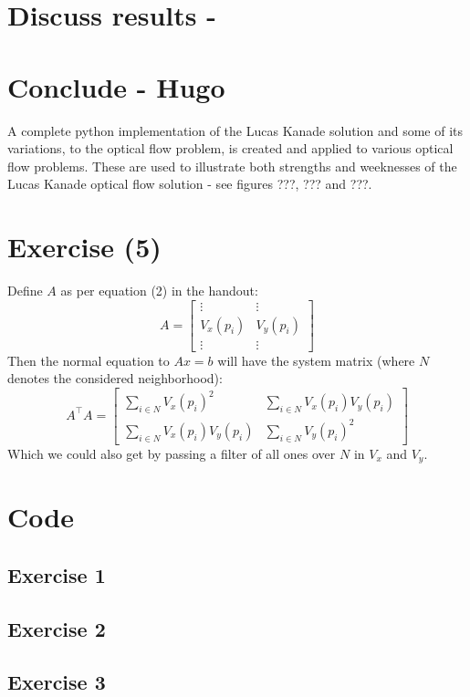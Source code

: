 \documentclass{article}
\begin{document}
\section{Discuss results - }

\section{Conclude - Hugo}
A complete python implementation of the Lucas Kanade solution and some of its variations, to the optical flow problem, is created and applied to various optical flow problems. These are used to illustrate both strengths and weeknesses of the Lucas Kanade optical flow solution - see figures ???, ??? and ???.





\section{Exercise (5)}
Define $A$ as per equation (2) in the handout:
\begin{equation}
    A = \begin{bmatrix}
    \vdots & \vdots \\
    V_{x}(p_i) & V_{y}(p_i) \\
    \vdots & \vdots
    \end{bmatrix}
\end{equation}
Then the normal equation to $Ax = b$ will have the system matrix (where $N$ denotes the considered neighborhood):
\begin{equation}
    A^\intercal A = \begin{bmatrix}
        \sum_{i \in N} V_{x}(p_i)^{2} & \sum_{i \in N} V_{x}(p_i)V_{y}(p_i) \\
        \sum_{i \in N} V_{x}(p_i)V_{y}(p_i) & \sum_{i \in N} V_{y}(p_i)^{2}
    \end{bmatrix}
\end{equation}
Which we could also get by passing a filter of all ones over $N$ in $V_x$ and $V_y$.

\newpage
\appendix
\section{Code}
\subsection{Exercise 1}


\subsection{Exercise 2}


\subsection{Exercise 3}

\end{document}
